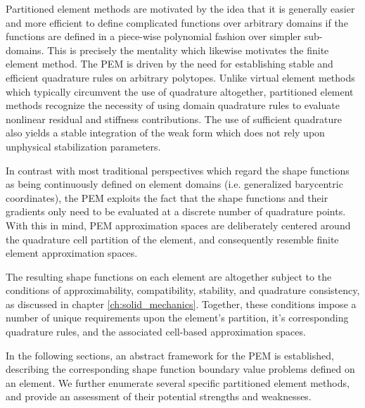 Partitioned element methods are motivated by the idea that it is generally easier and more efficient to define complicated functions over arbitrary domains if the functions are defined in a piece-wise polynomial fashion over simpler sub-domains. This is precisely the mentality which likewise motivates the finite element method. The PEM is driven by the need for establishing stable and efficient quadrature rules on arbitrary polytopes. Unlike virtual element methods which typically circumvent the use of quadrature altogether, partitioned element methods recognize the necessity of using domain quadrature rules to evaluate nonlinear residual and stiffness contributions. The use of sufficient quadrature also yields a stable integration of the weak form which does not rely upon unphysical stabilization parameters.

In contrast with most traditional perspectives which regard the shape functions as being continuously defined on element domains (i.e. generalized barycentric coordinates), the PEM exploits the fact that the shape functions and their gradients only need to be evaluated at a discrete number of quadrature points. With this in mind, PEM approximation spaces are deliberately centered around the quadrature cell partition of the element, and consequently resemble finite element approximation spaces.

The resulting shape functions on each element are altogether subject to the conditions of approximability, compatibility, stability, and quadrature consistency, as discussed in chapter \ref{ch:solid_mechanics}. Together, these conditions impose a number of unique requirements upon the element's partition, it's corresponding quadrature rules, and the associated cell-based approximation spaces.

In the following sections, an abstract framework for the PEM is established, describing the corresponding shape function boundary value problems defined on an element. We further enumerate several specific partitioned element methods, and provide an assessment of their potential strengths and weaknesses.


